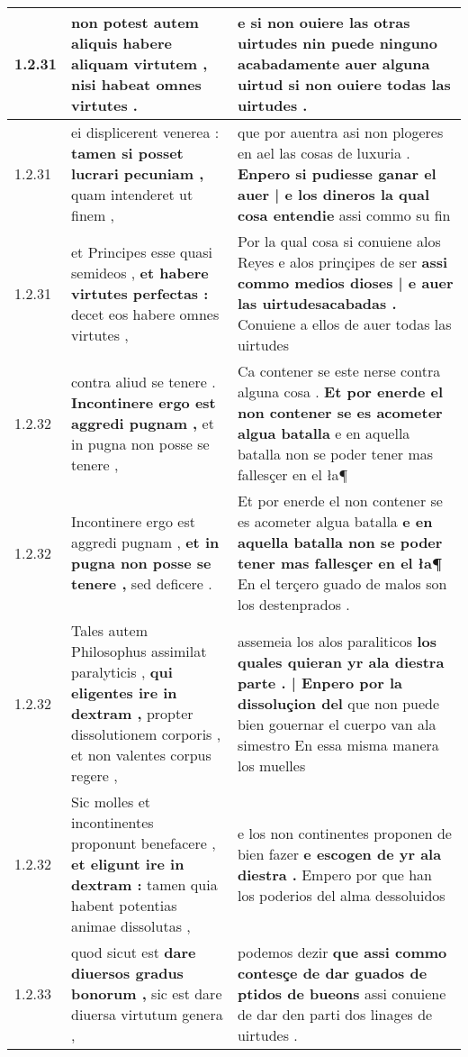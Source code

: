 \begin{tabular}{|p{1cm}|p{6.5cm}|p{6.5cm}|}
1.2.31 & non potest autem aliquis \textbf{ habere aliquam virtutem , } nisi habeat omnes virtutes . & e si non ouiere las otras uirtudes \textbf{ nin puede ninguno acabadamente auer alguna uirtud } si non ouiere todas las uirtudes . \\\hline
1.2.31 & ei displicerent venerea : \textbf{ tamen si posset lucrari pecuniam , } quam intenderet ut finem , & que por auentra asi non plogeres en ael las cosas de luxuria . \textbf{ Enpero si pudiesse ganar el auer | e los dineros la qual cosa entendie } assi commo su fin \\\hline
1.2.31 & et Principes esse quasi semideos , \textbf{ et habere virtutes perfectas : } decet eos habere omnes virtutes , & Por la qual cosa si conuiene alos Reyes e alos prinçipes de ser \textbf{ assi commo medios dioses | e auer las uirtudesacabadas . } Conuiene a ellos de auer todas las uirtudes \\\hline
1.2.32 & contra aliud se tenere . \textbf{ Incontinere ergo est aggredi pugnam , } et in pugna non posse se tenere , & Ca contener se este nerse contra alguna cosa . \textbf{ Et por enerde el non contener se es acometer algua batalla } e en aquella batalla non se poder tener mas fallesçer en el ła¶ \\\hline
1.2.32 & Incontinere ergo est aggredi pugnam , \textbf{ et in pugna non posse se tenere , } sed deficere . & Et por enerde el non contener se es acometer algua batalla \textbf{ e en aquella batalla non se poder tener mas fallesçer en el ła¶ } En el terçero guado de malos son los destenprados . \\\hline
1.2.32 & Tales autem Philosophus assimilat paralyticis , \textbf{ qui eligentes ire in dextram , } propter dissolutionem corporis , et non valentes corpus regere , & assemeia los alos paraliticos \textbf{ los quales quieran yr ala diestra parte . | Enpero por la dissoluçion del } que non puede bien gouernar el cuerpo van ala simestro En essa misma manera los muelles \\\hline
1.2.32 & Sic molles et incontinentes proponunt benefacere , \textbf{ et eligunt ire in dextram : } tamen quia habent potentias animae dissolutas , & e los non continentes proponen de bien fazer \textbf{ e escogen de yr ala diestra . } Empero por que han los poderios del alma dessoluidos \\\hline
1.2.33 & quod sicut est \textbf{ dare diuersos gradus bonorum , } sic est dare diuersa virtutum genera , & podemos dezir \textbf{ que assi commo contesçe de dar guados de ptidos de bueons } assi conuiene de dar den parti dos linages de uirtudes . \\\hline

\end{tabular}
